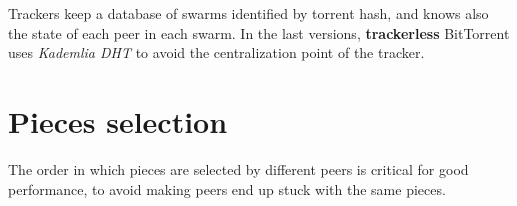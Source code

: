 Trackers keep a database of swarms identified by torrent hash, and knows also the state of each peer in each swarm.
In the last versions, \textbf{trackerless} BitTorrent uses \textit{Kademlia DHT} to avoid the centralization point of the tracker.

\section{Pieces selection}
The order in which pieces are selected by different peers is critical for good performance, to avoid making peers end up stuck with the same pieces.
